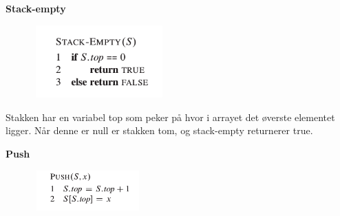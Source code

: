 \documentclass[12pt]{report}
\begin{document}
\vspace{\baselineskip}

\vspace{\baselineskip}
\setlength{\parskip}{10.56pt}

\vspace{\baselineskip}
\begin{multicols}{2}
{\fontsize{13pt}{15.6pt}\selectfont \textbf{Stack-empty}\par}\par




\begin{figure}[H]
	\begin{Center}
		\includegraphics[width=2.0in,height=1.1in]{./media/image10.png}
	\end{Center}
\end{figure}



{\fontsize{13pt}{15.6pt}\selectfont  \par}\par

Stakken har en variabel top som peker på hvor i arrayet det øverste elementet ligger. Når denne er null er stakken tom, og stack-empty returnerer true. \par

{\fontsize{13pt}{15.6pt}\selectfont \textbf{Push}\par}\par




\begin{figure}[H]
	\begin{Center}
		\includegraphics[width=1.66in,height=0.61in]{./media/image11.png}
	\end{Center}
\end{figure}



\end{multicols}
\end{document}
